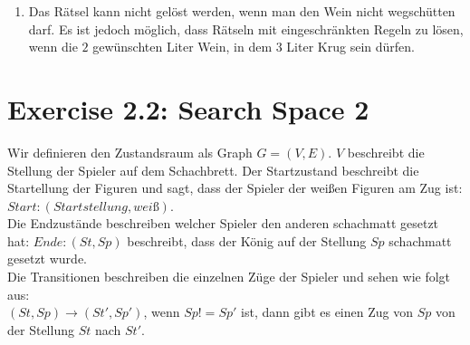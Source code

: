 \documentclass[a4paper]{scrartcl}
\def \blattnr {2}
\begin{document}
\begin{enumerate}
\begin{enumerate}[label=(\alph*)]
            \item
			Das Rätsel kann nicht gelöst werden, wenn man den Wein nicht wegschütten darf. Es ist jedoch 
			möglich, dass Rätseln mit eingeschränkten Regeln zu lösen, wenn die $2$  gewünschten Liter 
			Wein, in dem $3$ Liter Krug sein dürfen. \\

        \end{enumerate}

\end{enumerate}

\section*{Exercise \blattnr.2: Search Space 2}
\begin{enumerate}
	Wir definieren den Zustandsraum als Graph $G = (V, E)$. $V$ beschreibt die Stellung der Spieler auf 
	dem Schachbrett. Der Startzustand beschreibt die Startellung der Figuren und sagt, dass der Spieler
	der weißen Figuren am Zug ist: $Start: {(Startstellung, weiß)}$. \\
	Die Endzustände beschreiben welcher Spieler den anderen schachmatt gesetzt hat: $Ende: {(St, Sp)}$ 
	beschreibt, dass der König auf der Stellung $Sp$ schachmatt gesetzt wurde. \\
	Die Transitionen beschreiben die einzelnen Züge der Spieler und sehen wie folgt aus: \\
	$(St, Sp) \rightarrow (St', Sp')$, wenn $Sp != Sp'$ ist, dann gibt es einen Zug von $Sp$ von der 
	Stellung $St$ nach $St'$. \\
	
\end{enumerate}
\end{document}
